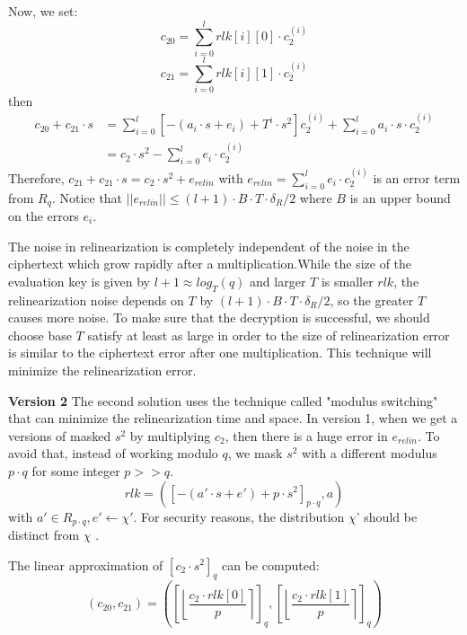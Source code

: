 \documentclass[A4paper,12pt]{article}
\begin{document}
Now, we set:
\begin{equation*}
	c_{20} = \sum_{i=0}^{l}rlk[i][0] \cdot c_2^{(i)}
\end{equation*}
\begin{equation*}
	c_{21} = \sum_{i=0}^{l}rlk[i][1] \cdot c_2^{(i)}
\end{equation*}
then
\begin{equation*}
	\begin{aligned}
	c_{20} + c_{21} \cdot s &= \sum_{i=0}^{l}[-(a_i \cdot s + e_i) + T^i \cdot s^2]c_2^{(i)} + \sum_{i=0}^{l}a_i \cdot s \cdot c_2^{(i)}\\
	&= c_2 \cdot s^2 - \sum_{i=0}^{l}e_i \cdot c_2^{(i)}
	\end{aligned}
\end{equation*}
Therefore, $c_{21} + c_{21} \cdot s = c_2 \cdot s^2 + e_{relin}$ with $e_{relin} = \sum_{i=0}^{l}e_i \cdot c_2^{(i)}$ is an error term from $R_q$. Notice that $||e_{relin}|| \leq (l+1) \cdot B \cdot T \cdot \delta_R/2$ where $B$ is an upper bound on the errors $e_i$.

The noise in relinearization is completely independent of the noise in the ciphertext which grow rapidly after a multiplication.While the size of the evaluation key is given by $l + 1 \approx log_T(q)$ and larger $T$ is smaller $rlk$, the relinearization noise depends on $T$ by $(l+1) \cdot B \cdot T \cdot \delta_R/2$, so the greater $T$ causes more noise. To make sure that the decryption is successful, we should choose base $T$ satisfy at least as large in order to the size of relinearization error is similar to the ciphertext error after one multiplication. This technique will minimize the relinearization error.

\textbf{Version 2}
The second solution uses the technique called "modulus switching" that can minimize the relinearization time and space. In version 1, when we get a versions of masked $s^2$ by multiplying $c_2$, then there is a huge error in $e_{relin}$. To avoid that, instead of working modulo $q$, we mask $s^2$ with a different modulus $p \cdot q$ for some integer $p >> q$.
\begin{equation*}
	rlk = ([-(a' \cdot s + e') + p \cdot s^2]_{p \cdot q}, a)
\end{equation*}
with $a' \in R_{p \cdot q}, e' \leftarrow \chi'$. For security reasons, the distribution $\chi$' should be distinct from $\chi$ \cite{SHE}.

The linear approximation of $[c_2 \cdot s^2]_q$ can be computed:
\begin{equation*}
	(c_{20}, c_{21}) = \left( \left [ \left \lfloor  \frac{c_2 \cdot rlk[0]}{p}\right \rceil \right ]_q, \left [ \left \lfloor  \frac{c_2 \cdot rlk[1]}{p}\right \rceil \right ]_q \right)
\end{equation*}
\end{document}
